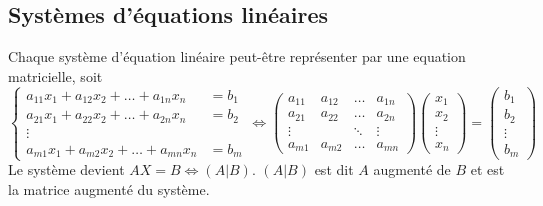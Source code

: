 \subsection{Systèmes d'équations linéaires}
\noindent
\begin{definition}
    Chaque système d'équation linéaire peut-être représenter par une equation matricielle, soit
    \[
        \begin{cases}
            a_{11}x_1 + a_{12}x_2 + \ldots + a_{1n}x_n & = b_1 \\
            a_{21}x_1 + a_{22}x_2 + \ldots + a_{2n}x_n & = b_2 \\
            \vdots                                             \\
            a_{m1}x_1 + a_{m2}x_2 + \ldots + a_{mn}x_n & = b_m
        \end{cases} \iff \begin{pmatrix}
            a_{11} & a_{12}      & \dots  & a_{1n} \\
            a_{21} & a_{22}      & \dots  & a_{2n} \\
            \vdots & \phantom{a} & \ddots & \vdots \\
            a_{m1} & a_{m2}      & \dots  & a_{mn}
        \end{pmatrix} \begin{pmatrix}
            x_1    \\
            x_2    \\
            \vdots \\
            x_n
        \end{pmatrix} = \begin{pmatrix}
            b_1    \\
            b_2    \\
            \vdots \\
            b_m
        \end{pmatrix}
    \]
    Le système devient $AX = B \iff (A|B)$. $(A|B)$ est dit $A$ augmenté de $B$ et est la matrice augmenté du système.
\end{definition}

